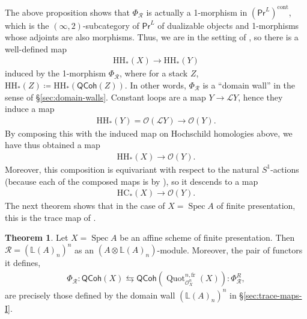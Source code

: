 \documentclass{article}
\numberwithin{equation}{section}
\theoremstyle{quest}
\theoremstyle{definition}
\newtheorem{thm}{Theorem}[section]
\theoremstyle{remark}
\DeclareMathOperator{\Spec}{Spec}
\DeclareMathOperator{\Quot}{Quot}
\begin{document}
The above proposition shows that $\Phi_{\mathscr{R}}$ is actually a 1-morphism in $(\mathsf{Pr}^L)^{\text{cont}}$, which is the $(\infty,2)$-subcategory of $\mathsf{Pr}^L$ of dualizable objects and 1-morphisms whose adjoints are also morphisms. Thus, we are in the setting of \cite[\S3.4]{nonlinear-trace}, so there is a well-defined map
\begin{align*}
	\mathrm H\mathrm H_*(X)\to \mathrm H\mathrm H_*(Y)
\end{align*} 
induced by the 1-morphism $\Phi_{\mathscr{R}}$, where for a stack $Z$, $\mathrm H\mathrm H_*(Z)\coloneqq \mathrm H\mathrm H_*(\mathsf{QCoh}(Z))$. In other words, $\Phi_{\mathscr{R}}$ is a ``domain wall'' in the sense of \S\ref{sec:domain-walls}. Constant loops are a map $Y\to \mathscr{L}Y$, hence they induce a map
\begin{align*}
	\mathrm H\mathrm H_*(Y)=\mathscr{O}(\mathscr{L}Y)\to \mathscr{O}(Y).
\end{align*} 
By composing this with the induced map on Hochschild homologies above, we have thus obtained a map
\begin{align*}
	\mathrm H\mathrm H_*(X)\to \mathscr{O}(Y).
\end{align*} 
Moreover, this composition is equivariant with respect to the natural $S^1$-actions (because each of the composed maps is by \cite[Section 2.3]{HSS}), so it descends to a map
\begin{align*}
	\mathrm H\mathrm C_*(X)\to \mathscr{O}(Y).
\end{align*} 
The next theorem shows that in the case of $X=\Spec A$ of finite presentation, this is the trace map of \cite{BKR}.
\begin{thm}\label{thm:stack-domain-wall}
	Let $X=\Spec A$ be an affine scheme of finite presentation. Then $\mathscr{R}=(\mathbb{L}(A)_n)^n$ as an $(A\otimes \mathbb{L}(A)_n)$-module. Moreover, the pair of functors it defines,
	\begin{align*}
	\Phi_{\mathscr{R}}:	\mathsf{QCoh}(X)\leftrightarrows \mathsf{QCoh}(\Quot^{n,\text{fr}}_{\mathscr{O}_X^n}(X)):\Phi_{\mathscr{R}}^R,
	\end{align*} 
	are precisely those defined by the domain wall $(\mathbb{L}(A)_n)^n$ in \S\ref{sec:trace-maps-I}.
\end{thm} 
\end{document}
